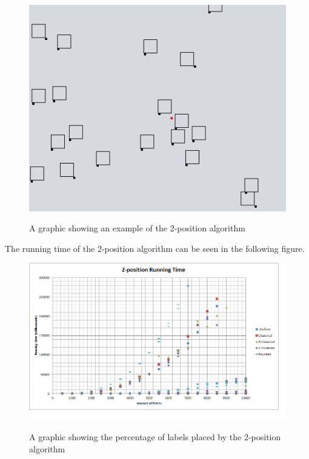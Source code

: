 \documentclass[crop=false,a4paper,oneside,11pt]{standalone}
\begin{document}
\begin{figure}[h!]
\centering
  \includegraphics[scale = 0.5]{2pos_example.JPG}\\
  \caption{A graphic showing an example of the 2-position algorithm}
 \end{figure}

The running time of the 2-position algorithm can be seen in the following figure.
\begin{figure}[h!]
 \centering
  \includegraphics[scale = 0.5]{2PosRunningTime.png}\\
  \caption{A graphic showing the percentage of labels placed by the 2-position algorithm}
 \end{figure}
\end{document}
